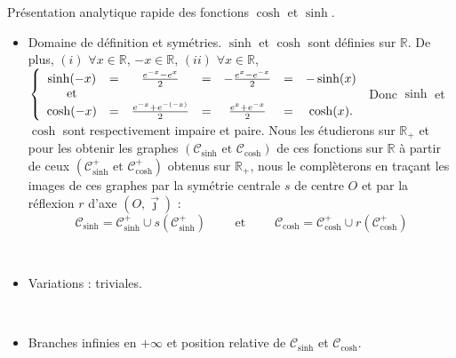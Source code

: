 \documentclass{article}
\renewenvironment{question_kholle}[2][ ]
{
	\subsection{\texorpdfstring{#2}{}}
	\notblank{#1}
	{
		\noindent #1
		\bigbreak
	}
	{}
	\begin{proof}
}
{
	\end{proof}
}
\begin{document}
\begin{question_kholle}{Présentation analytique rapide des fonctions \(\cosh\) et \(\sinh \).}
	~\smallbreak

	\begin{itemize}[label=$\bullet$]
		\item Domaine de définition et symétries.
		      \newline
		      $\sinh$ et $\cosh$ sont définies sur $\mathbb{R}$.
		      \newline
		      De plus,
		      \newline
		      $(i)$ $\forall x \in \mathbb{R}$, $-x\in \mathbb{R}$,
		      \newline
		      $(ii)$ $\forall x \in \mathbb{R}$,
		      $
			      \left\{ \begin{array}{c c c c c c c}
				      \sinh (-x) & = & \frac{e^{-x} - e^{x}}{2}     & = & - \frac{e^x - e^{-x}}{2} & = & -\sinh(x) \\
				      \text{et}  &   &                              &   &                          &   &           \\
				      \cosh (-x) & = & \frac{e^{-x} + e^{-(-x)}}{2} & = & \frac{e^x + e^{-x}}{2}   & = & \cosh(x).
			      \end{array}
			      \right.
		      $
		      \newline
		      Donc $\sinh$ et $\cosh$ sont respectivement impaire et paire.
		      \newline
		      Nous les étudierons sur $\mathbb{R}_+$ et pour les obtenir les graphes $(\mathcal{C}_{\sinh} \text{ et } \mathcal{C}_{\cosh})$ de ces fonctions sur $\mathbb{R}$ à partir de ceux $(\mathcal{C}_{\sinh}^+ \text{ et } \mathcal{C}_{\cosh}^+)$ obtenus sur $\mathbb{R}_+$, nous le complèterons en traçant les images de ces graphes par la symétrie centrale $s$ de centre $O$ et par la réflexion $r$ d'axe $\left( O, \overrightarrow{\jmath} \right)$ :
		      \[
			      \mathcal{C}_{\sinh} = \mathcal{C}_{\sinh}^+ \cup s \left( \mathcal{C}_{\sinh}^+ \right) \qquad \text{ et } \qquad \mathcal{C}_{\cosh} = \mathcal{C}_{\cosh}^+ \cup r \left( \mathcal{C}_{\cosh}^+ \right)
		      \]

		      \

		\item Variations : triviales.

		      \

		\item Branches infinies en $+\infty$ et position relative de $\mathcal{C}_{\sinh}$ et $\mathcal{C}_{\cosh}$.


\end{itemize}
\end{question_kholle}
\end{document}
